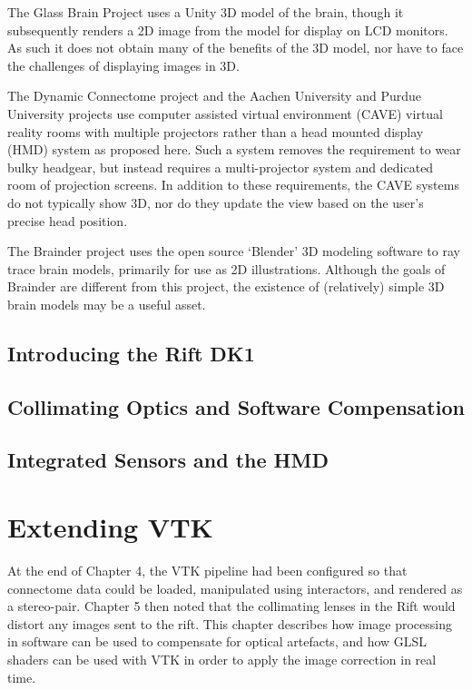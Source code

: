\documentclass[MSc,paper=a4,pagesize=auto]{icldt}
\begin{document}
The Glass Brain Project uses a Unity 3D model of the brain, though it subsequently renders a 2D image from the model for display on LCD monitors. As such it does not obtain many of the benefits of the 3D model, nor have to face the challenges of displaying images in 3D.

The Dynamic Connectome project and the Aachen University and Purdue University projects use computer assisted virtual environment (CAVE) virtual reality rooms with multiple projectors rather than a head mounted display (HMD) system as proposed here. Such a system removes the requirement to wear bulky headgear, but instead requires a multi-projector system and dedicated room of projection screens. In addition to these requirements, the CAVE systems do not typically show 3D, nor do they update the view based on the user’s precise head position.

The Brainder project uses the open source ‘Blender’ 3D modeling software to ray trace brain models, primarily for use as 2D illustrations. Although the goals of Brainder are different from this project, the existence of (relatively) simple 3D brain models may be a useful asset. 



\section{Introducing the Rift DK1}
\section{Collimating Optics and Software Compensation}
\section{Integrated Sensors and the HMD}

\chapter{Extending VTK}
At the end of Chapter 4, the VTK pipeline had been configured so that connectome data could be loaded, manipulated using interactors, and rendered as a stereo-pair. Chapter 5 then noted that the collimating lenses in the Rift would distort any images sent to the rift. This chapter describes how image processing in software can be used to compensate for optical artefacts, and how GLSL shaders can be used with VTK in order to apply the image correction in real time. 
\end{document}
